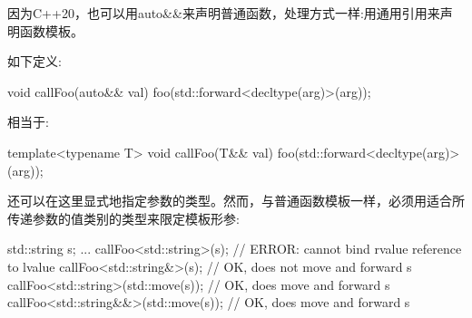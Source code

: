 因为C++20，也可以用auto\&\&来声明普通函数，处理方式一样:用通用引用来声明函数模板。

如下定义:

\begin{cppcode}
void callFoo(auto&& val) {
	foo(std::forward<decltype(arg)>(arg));
}
\end{cppcode}

相当于:

\begin{cppcode}
template<typename T>
void callFoo(T&& val) {
	foo(std::forward<decltype(arg)>(arg));
}
\end{cppcode}

还可以在这里显式地指定参数的类型。然而，与普通函数模板一样，必须用适合所传递参数的值类别的类型来限定模板形参:

\begin{cppcode}
std::string s;
...
callFoo<std::string>(s); // ERROR: cannot bind rvalue reference to lvalue
callFoo<std::string&>(s); // OK, does not move and forward s
callFoo<std::string>(std::move(s)); // OK, does move and forward s
callFoo<std::string&&>(std::move(s)); // OK, does move and forward s
\end{cppcode}






































